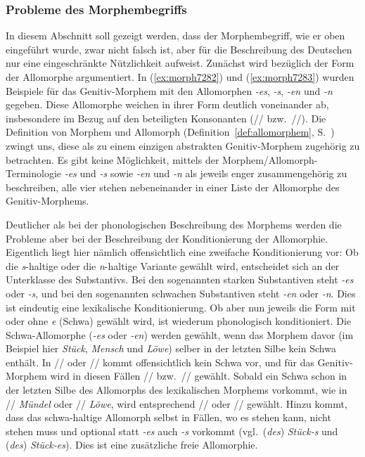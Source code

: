 \subsubsection[Probleme des Morphembegriffs]{\Opsional Probleme des Morphembegriffs}

\label{sec:morphemprob}

In diesem Abschnitt soll gezeigt werden, dass der Morphembegriff, wie er oben eingeführt wurde, zwar nicht falsch ist, aber für die Beschreibung des Deutschen nur eine eingeschränkte Nützlichkeit aufweist.
Zunächst wird bezüglich der Form der Allomorphe argumentiert. 
In (\ref{ex:morph7282}) und (\ref{ex:morph7283}) wurden Beispiele für das Genitiv-Morphem mit den Allomorphen \textit{-es}, \textit{-s}, \textit{-en} und \textit{-n} gegeben.
Diese Allomorphe weichen in ihrer Form deutlich voneinander ab, insbesondere im Bezug auf den beteiligten Konsonanten (// bzw.\ //).
Die Definition von Morphem und Allomorph (Definition~\ref{def:allomorphem}, S.~\pageref{def:allomorphem}) zwingt uns, diese als zu einem einzigen abstrakten Genitiv-Morphem zugehörig zu betrachten.
Es gibt keine Möglichkeit, mittels der Morphem\slash Allomorph-Terminologie \textit{-es} und \textit{-s} sowie \textit{-en} und \textit{-n} als jeweils enger zusammengehörig zu beschreiben, alle vier stehen nebeneinander in einer Liste der Allomorphe des Genitiv-Morphems.

Deutlicher als bei der phonologischen Beschreibung des Morphems werden die Probleme aber bei der Beschreibung der Konditionierung der Allomorphie.
Eigentlich liegt hier nämlich offensichtlich eine zweifache Konditionierung vor:
Ob die \textit{s}-haltige oder die \textit{n}-haltige Variante gewählt wird, entscheidet sich an der Unterklasse des Substantivs.
Bei den sogenannten starken Substantiven steht \textit{-es} oder \textit{-s}, und bei den sogenannten schwachen Substantiven steht \textit{-en} oder \textit{-n}.
Dies ist eindeutig eine lexikalische Konditionierung.
Ob aber nun jeweils die Form mit oder ohne \textit{e} (Schwa) gewählt wird, ist wiederum phonologisch konditioniert.
Die Schwa-Allomorphe (\textit{-es} oder \textit{-en}) werden gewählt, wenn das Morphem davor (im Beispiel hier \textit{Stück}, \textit{Mensch} und \textit{Löwe}) selber in der letzten Silbe kein Schwa enthält.
In // oder // kommt offensichtlich kein Schwa vor, und für das Genitiv-Morphem wird in diesen Fällen // bzw.\ // gewählt.
Sobald ein Schwa schon in der letzten Silbe des Allomorphs des lexikalischen Morphems vorkommt, wie in // \textit{Mündel} oder // \textit{Löwe}, wird entsprechend // oder // gewählt.
Hinzu kommt, dass das schwa-haltige Allomorph selbst in Fällen, wo es stehen kann, nicht stehen muss und optional statt \textit{-es} auch \textit{-s} vorkommt (vgl.\ (\textit{des}) \textit{Stück-s} und (\textit{des}) \textit{Stück-es}).
Dies ist eine zusätzliche freie Allomorphie.

